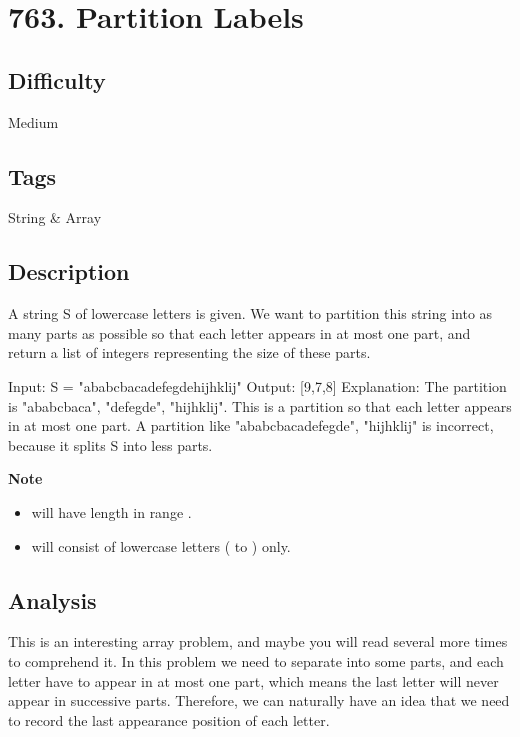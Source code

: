 \tocless\section{763. Partition Labels}
\label{algo:763}

\subsection*{Difficulty}
Medium

\subsection*{Tags}
String \& Array

\subsection*{Description}
A string S of lowercase letters is given. We want to partition this string into as many parts as possible so that each letter appears in at most one part, and return a list of integers representing the size of these parts.

\begin{example}
\begin{multilinecode}
Input: S = "ababcbacadefegdehijhklij"
Output: [9,7,8]
Explanation:
The partition is "ababcbaca", "defegde", "hijhklij".
This is a partition so that each letter appears in at most one part.
A partition like "ababcbacadefegde", "hijhklij" is incorrect, because it splits S into less parts.
\end{multilinecode}
\end{example}

\textbf{Note}
\begin{itemize}
    \item {} will have length in range \inlinecode{[1, 500]}.
    \item {} will consist of lowercase letters ( to ) only.
\end{itemize}

\subsection*{Analysis}
This is an interesting array problem, and maybe you will read several more times to comprehend it. In this problem we need to separate  into some parts, and each letter have to appear in at most one part, which means the last letter will never appear in successive parts. Therefore, we can naturally have an idea that we need to record the last appearance position of each letter.

